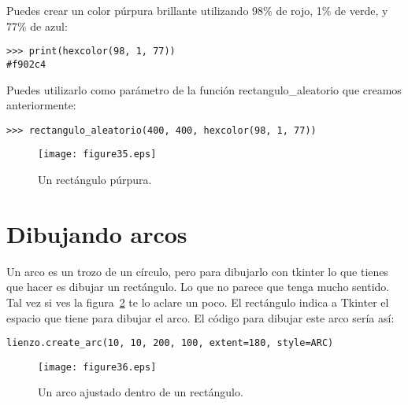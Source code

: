 \noindent
Puedes crear un color púrpura brillante utilizando 98\% de rojo, 1\% de verde, y 77\% de azul:

\begin{listing}
\begin{verbatim}
>>> print(hexcolor(98, 1, 77))
#f902c4
\end{verbatim}
\end{listing}

\noindent
Puedes utilizarlo como parámetro de la función rectangulo\_aleatorio que creamos anteriormente: 

\begin{listing}
\begin{verbatim}
>>> rectangulo_aleatorio(400, 400, hexcolor(98, 1, 77))
\end{verbatim}
\end{listing}

\begin{figure}
\begin{center}
\texttt{[image: figure35.eps]}
\end{center}
\caption{Un rectángulo púrpura.}\label{fig35}
\end{figure}

\section{Dibujando arcos}

Un arco es un trozo de un círculo, pero para dibujarlo con tkinter lo que tienes que hacer es dibujar un rectángulo. Lo que no parece que tenga mucho sentido. Tal vez si ves la figura~\ref{fig36} te lo aclare un poco. El rectángulo indica a Tkinter el espacio que tiene para dibujar el arco.  El código para dibujar este arco sería así:

\begin{listing}
\begin{verbatim}
lienzo.create_arc(10, 10, 200, 100, extent=180, style=ARC)
\end{verbatim}
\end{listing}

\begin{figure}
\begin{center}
\texttt{[image: figure36.eps]}
\end{center}
\caption{Un arco ajustado dentro de un rectángulo.}\label{fig36}
\end{figure}

